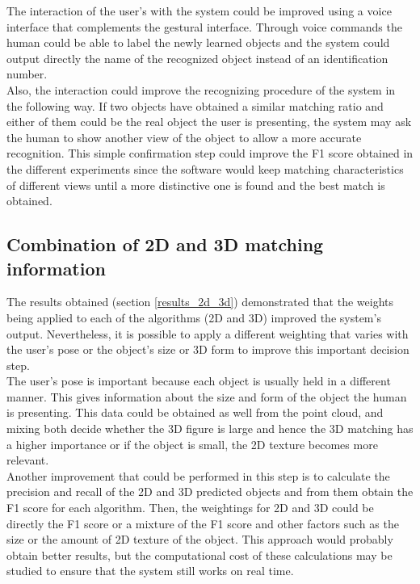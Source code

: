 	The interaction of the user's with the system could be improved using a voice interface that complements the gestural interface. 
	Through voice commands the human could be able to label the newly learned objects and the system could output directly the name of the recognized object instead of an identification number. 
	\\

	Also, the interaction could improve the recognizing procedure of the system in the following way. 
	If two objects have obtained a similar matching ratio and either of them could be the real object the user is presenting, the system may ask the human to show another view of the object to allow a more accurate recognition. 
	This simple confirmation step could improve the F1 score obtained in the different experiments since the software would keep matching characteristics of different views until a more distinctive one is found and the best match is obtained. 


	\subsection{Combination of 2D and 3D matching information}
	\label{future_decision}

	The results obtained (section \ref{results_2d_3d}) demonstrated that the weights being applied to each of the algorithms (2D and 3D) improved the system's output. 
	Nevertheless, it is possible to apply a different weighting that varies with the user's pose or the object's size or 3D form to improve this important decision step. 
	\\

	The user's pose is important because each object is usually held in a different manner. 
	This gives information about the size and form of the object the human is presenting. 
	This data could be obtained as well from the point cloud, and mixing both decide whether the 3D figure is large and hence the 3D matching has a higher importance or if the object is small, the 2D texture becomes more relevant.
	\\

	Another improvement that could be performed in this step is to calculate the precision and recall of the 2D and 3D predicted objects and from them obtain the F1 score for each algorithm. 
	Then, the weightings for 2D and 3D could be directly the F1 score or a mixture of the F1 score and other factors such as the size or the amount of 2D texture of the object.
	This approach would probably obtain better results, but the computational cost of these calculations may be studied to ensure that the system still works on real time.  


